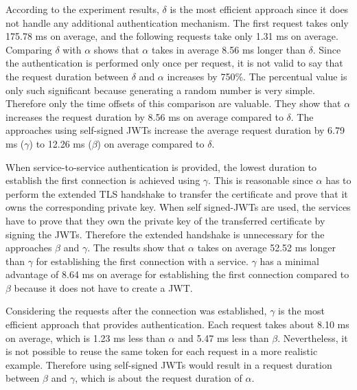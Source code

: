 According to the experiment results, $\delta$ is the most efficient approach since it does not handle any additional authentication mechanism.
The first request takes only 175.78 ms on average, and the following requests take only 1.31 ms on average.
Comparing $\delta$ with $\alpha$ shows that $\alpha$ takes in average 8.56 ms longer than $\delta$.
Since the authentication is performed only once per request, it is not valid to say that the request duration between $\delta$ and $\alpha$ increases by 750\%.
The percentual value is only such significant because generating a random number is very simple.
Therefore only the time offsets of this comparison are valuable.
They show that $\alpha$ increases the request duration by 8.56 ms on average compared to $\delta$.
The approaches using self-signed JWTs increase the average request duration by 6.79 ms ($\gamma$) to 12.26 ms ($\beta$) on average compared to $\delta$. 

When service-to-service authentication is provided, the lowest duration to establish the first connection is achieved using $\gamma$.
This is reasonable since $\alpha$ has to perform the extended TLS handshake to transfer the certificate and prove that it owns the corresponding private key.
When self signed-JWTs are used, the services have to prove that they own the private key of the transferred certificate by signing the JWTs.
Therefore the extended handshake is unnecessary for the approaches $\beta$ and $\gamma$.
The results show that $\alpha$ takes on average 52.52 ms longer than $\gamma$ for establishing the first connection with a service.
$\gamma$ has a minimal advantage of 8.64 ms on average for establishing the first connection compared to $\beta$ because it does not have to create a JWT.

Considering the requests after the connection was established, $\gamma$ is the most efficient approach that provides authentication.
Each request takes about 8.10 ms on average, which is 1.23 ms less than $\alpha$ and 5.47 ms less than $\beta$.
Nevertheless, it is not possible to reuse the same token for each request in a more realistic example.
Therefore using self-signed JWTs would result in a request duration between $\beta$ and $\gamma$, which is about the request duration of $\alpha$.


